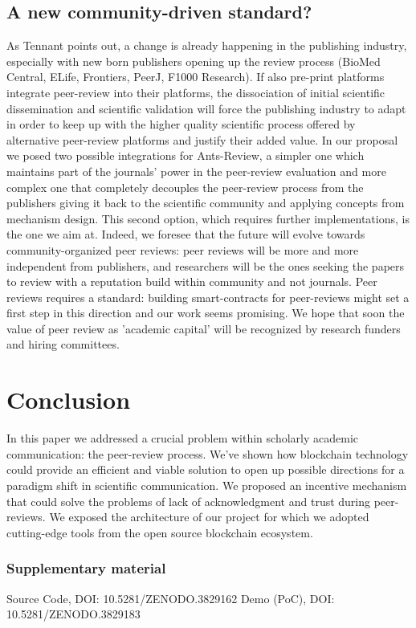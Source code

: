\documentclass[runningheads]{llncs}
\begin{document}
\subsection{A new community-driven standard?}
As Tennant points out\cite{Tennant2017-F1000R}, a change is already happening in the publishing industry, especially with new born publishers opening up the review process (BioMed Central, ELife, Frontiers, PeerJ, F1000 Research). If also pre-print platforms integrate peer-review into their platforms, the dissociation of initial scientific dissemination and scientific validation will force the publishing industry to adapt in order to keep up with the higher quality scientific process offered by alternative peer-review platforms and justify their added value.
In our proposal we posed two possible integrations for Ants-Review, a simpler one which maintains part of the journals' power in the peer-review evaluation and more complex one that completely decouples the peer-review process from the publishers giving it back to the scientific community and applying concepts from mechanism design. This second option, which requires further implementations, is the one we aim at. Indeed, we foresee that the future will evolve towards community-organized peer reviews: peer reviews will be more and more independent from publishers, and researchers will be the ones seeking the papers to review with a reputation build within community and not journals.
Peer reviews requires a standard: building smart-contracts for peer-reviews might set a first step in this direction and our work seems promising. We hope that soon the value of peer review as 'academic capital' will be recognized by research funders and hiring committees.

\section{Conclusion}
In this paper we addressed a crucial problem within scholarly academic communication: the peer-review process. We've shown how blockchain technology could provide an efficient and viable solution to open up possible directions for a paradigm shift in scientific communication. We proposed an incentive mechanism that could solve the problems of lack of acknowledgment and trust during peer-reviews. We exposed the architecture of our project for which we adopted cutting-edge tools from the open source blockchain ecosystem.

\subsubsection{Supplementary material}
Source Code, DOI: 10.5281/ZENODO.3829162
\newline Demo (PoC), DOI: 10.5281/ZENODO.3829183
\end{document}
